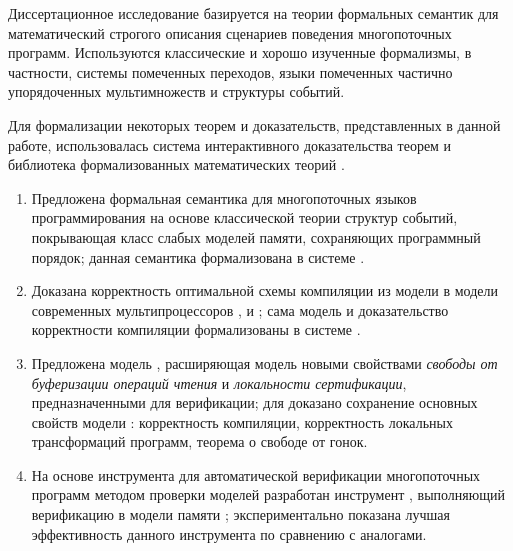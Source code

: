 
{\methods} Диссертационное исследование базируется на теории формальных семантик
для математический строгого описания сценариев поведения многопоточных программ. 
Используются классические и хорошо изученные формализмы, в частности, 
системы помеченных переходов, языки помеченных частично 
упорядоченных мультимножеств и структуры событий. 

Для формализации некоторых теорем и доказательств, представленных в данной работе, 
использовалась система интерактивного доказательства теорем \coq 
и библиотека формализованных математических теорий \mathcomp.


{}
\begin{enumerate}[beginpenalty=10000] %

  \item Предложена формальная семантика для многопоточных языков программирования
    на основе классической теории структур событий, 
    покрывающая класс слабых моделей памяти, сохраняющих программный порядок;
    данная семантика формализована в системе \coq.

  \item Доказана корректность оптимальной схемы компиляции из модели \Wkm
    в модели современных мультипроцессоров \TSO, \ARM и \POWER;
    сама модель \Wkm и доказательство корректности компиляции
    формализованы в системе \coq.

  \item Предложена модель \WkmS, расширяющая модель \Wkm 
    новыми свойствами \emph{свободы от буферизации операций чтения}
    и \emph{локальности сертификации}, предназначенными для верификации;
    для \WkmS доказано сохранение основных свойств модели \Wkm: корректность компиляции,
    корректность локальных трансформаций программ,
    теорема о свободе от гонок.

  \item На основе инструмента \genmc для автоматической 
    верификации многопоточных программ методом проверки моделей
    разработан инструмент \wmc, выполняющий верификацию 
    в модели памяти \WkmS;
    экспериментально показана лучшая эффективность 
    данного инструмента по сравнению с аналогами.

\end{enumerate}


